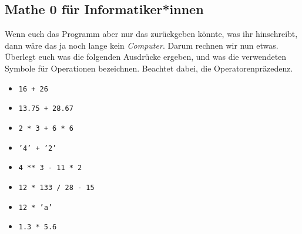 \subsection{Mathe 0 für Informatiker*innen}
Wenn euch das Programm aber nur das zurückgeben könnte, was ihr hinschreibt,
dann wäre das ja noch lange kein \textit{Computer}. Darum rechnen wir nun etwas.
Überlegt euch was die folgenden Ausdrücke ergeben, und was die verwendeten
Symbole für Operationen bezeichnen. Beachtet dabei, die Operatorenpräzedenz.

\begin{multicols}{3}
\begin{itemize}
    \item \texttt{16 + 26}
    \item \texttt{13.75 + 28.67}
    \item \texttt{2 * 3 + 6 * 6}
    \item \texttt{'4' + '2'}
    \item \texttt{4 ** 3 - 11 * 2}
    \item \texttt{12 * 133 / 28 - 15}
    \item \texttt{12 * 'a'}
    \item \texttt{1.3 * 5.6}
\end{itemize}
\end{multicols}

